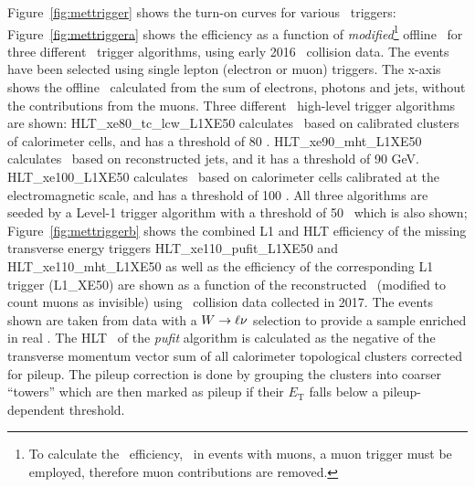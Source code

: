 				Figure~\ref{fig:mettrigger} shows the turn-on curves for various \met\ triggers: Figure~\ref{fig:mettriggera} shows the efficiency as a function of \textit{modified}\footnote{To calculate the \met\ efficiency, \eg\ in events with muons, a muon trigger must be employed, therefore muon contributions are removed.} offline \met\ for three different \met\ trigger algorithms, using early 2016 \pp\ collision data. The events have been selected using single lepton (electron or muon) triggers. The x-axis shows the offline \met\ calculated from the sum of electrons, photons and jets, without the contributions from the muons. Three different \met\ high-level trigger algorithms are shown: HLT\_xe80\_tc\_lcw\_L1XE50 calculates \met\ based on calibrated clusters of calorimeter cells, and has a threshold of 80 \GeV. HLT\_xe90\_mht\_L1XE50 calculates \met\ based on reconstructed jets, and it has a threshold of 90 GeV. HLT\_xe100\_L1XE50 calculates \met\ based on calorimeter cells calibrated at the electromagnetic scale, and has a threshold of 100 \GeV. All three algorithms are seeded by a Level-1 trigger algorithm with a threshold of 50 \GeV\ which is also shown; Figure~\ref{fig:mettriggerb} shows the combined \ac{L1} and \ac{HLT} efficiency of the missing transverse energy triggers HLT\_xe110\_pufit\_L1XE50 and HLT\_xe110\_mht\_L1XE50 as well as the efficiency of the corresponding \ac{L1} trigger (L1\_XE50) are shown as a function of the reconstructed \met\ (modified to count muons as invisible) using \pp\ collision data collected in 2017. The events shown are taken from data with a $W \rightarrow \ell \nu$ selection to provide a sample enriched in real \met. The \ac{HLT} \met\ of the \textit{pufit} algorithm is calculated as the negative of the transverse momentum vector sum of all calorimeter topological clusters corrected for pileup. The pileup correction is done by grouping the clusters into coarser “towers” which are then marked as pileup if their $E_\mathrm{T}$ falls below a pileup-dependent threshold.


